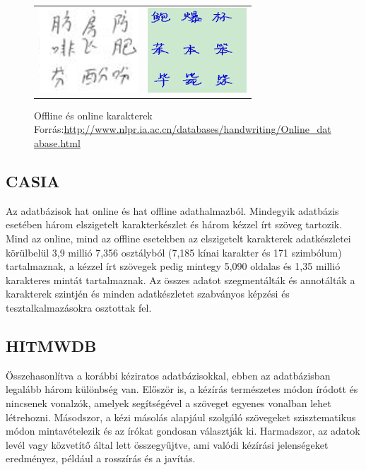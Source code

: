 \begin{figure}[h]
\centering
\captionsetup{justification=centering}
\begin{tabular}{ l r }
\includegraphics[scale=1.2]{images/offlineChars} & \includegraphics[scale=1.2]{images/onlineChars}
\end{tabular}
\caption{Offline és online karakterek
\hspace{\textwidth}Forrás:\url{http://www.nlpr.ia.ac.cn/databases/handwriting/Online_database.html}}
\label{fig:offline_online}
\end{figure}

\subsection{CASIA} 

Az adatbázisok hat online és hat offline adathalmazból. Mindegyik adatbázis esetében három elszigetelt karakterkészlet és három kézzel írt szöveg tartozik. Mind az online, mind az offline esetekben az elszigetelt karakterek adatkészletei körülbelül 3,9 millió 7,356 osztályból (7,185 kínai karakter és 171 szimbólum) tartalmaznak, a kézzel írt szövegek pedig mintegy 5,090 oldalas és 1,35 millió karakteres mintát tartalmaznak. Az összes adatot szegmentálták és annotálták a karakterek szintjén és minden adatkészletet szabványos képzési és tesztalkalmazásokra osztottak fel.

\subsection{HITMWDB}

Összehasonlítva a korábbi kéziratos adatbázisokkal, ebben az adatbázisban legalább három különbség van. Először is, a kézírás természetes módon íródott és nincsenek vonalzók, amelyek segítségével a szöveget egyenes vonalban lehet létrehozni. Másodszor, a kézi másolás alapjául szolgáló szövegeket szisztematikus módon mintavételezik és az írókat gondosan választják ki. Harmadszor, az adatok levél vagy közvetítő által lett összegyűjtve, ami valódi kézírási jelenségeket eredményez, például a rosszírás és a javítás.\\

